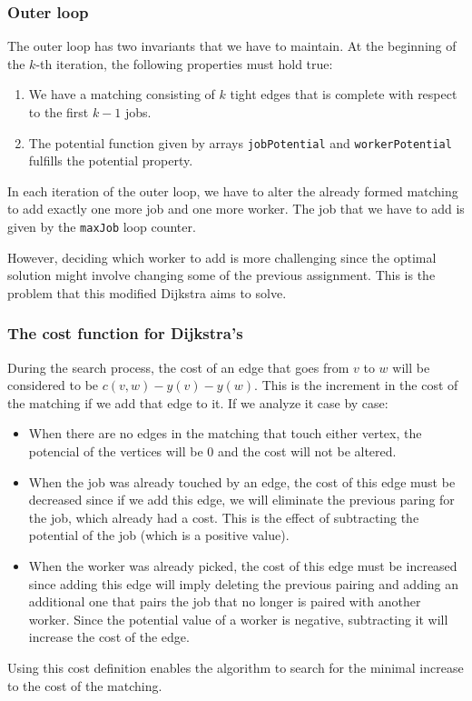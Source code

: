 \subsubsection{Outer loop}
The outer loop has two invariants that we have to maintain.
At the beginning of the $k$-th iteration,
the following properties must hold true:
\begin{enumerate}
		\setlength{\itemsep}{0pt}
		\item We have a matching consisting of $k$ tight edges that is
				complete with respect to the first $k-1$ jobs.
		\item The potential function given by arrays \texttt{jobPotential}
				and \texttt{workerPotential} fulfills the potential property.
\end{enumerate}
In each iteration of the outer loop, we have to alter the already formed
matching to add exactly one more job and one more worker. 
The job that we have to add is given by the \texttt{maxJob} loop
counter.

However, deciding which worker to add is more challenging since the optimal
solution might involve changing some of the previous assignment. 
This is the problem that this modified Dijkstra aims to solve.

\subsubsection{The cost function for Dijkstra's}
During the search process, the cost of  an edge that goes from
$v$ to $w$ will be considered to be $c(v,w)-y(v)-y(w)$. This is the
increment in the cost of the matching if we add that edge to 
it. If we analyze it case by case:
\begin{itemize}
		\item When there are no edges in the matching that touch either 
				vertex, the potencial of the vertices will be 0 and the 
				cost will not be altered.
		\item When the job was already touched by an edge, the cost of this 
				edge must be decreased since if we add this edge, we will
				eliminate the previous paring for the job, which already
				had a cost. This is the effect of subtracting the potential
				of the job (which is a positive value).

		\item When the worker was already picked, the cost of this edge
				must be increased since adding this edge will imply 
				deleting the previous pairing and adding an additional
				one that pairs the job that no longer is paired with
				another worker. Since the potential value of a worker
				is negative, subtracting it will increase the cost of the
				edge.
\end{itemize}
Using this cost definition enables the algorithm to search for the 
minimal increase to the cost of the matching.

